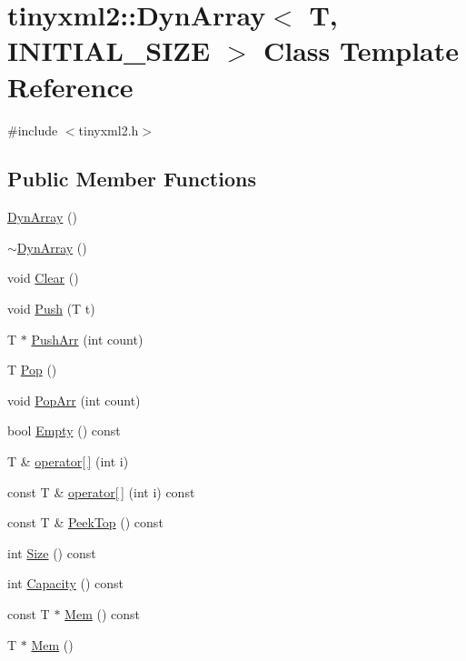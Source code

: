 \hypertarget{classtinyxml2_1_1_dyn_array}{}\section{tinyxml2\+:\+:Dyn\+Array$<$ T, I\+N\+I\+T\+I\+A\+L\+\_\+\+S\+I\+ZE $>$ Class Template Reference}
\label{classtinyxml2_1_1_dyn_array}


{\ttfamily \#include $<$tinyxml2.\+h$>$}

\subsection*{Public Member Functions}
\begin{DoxyCompactItemize}
\item 
\hyperlink{classtinyxml2_1_1_dyn_array_aaad72f384e761c70a4519183eb8fea17}{Dyn\+Array} ()
\item 
\hyperlink{classtinyxml2_1_1_dyn_array_a4a6aefdca7fe0d3f4068e31870a5adee}{$\sim$\+Dyn\+Array} ()
\item 
void \hyperlink{classtinyxml2_1_1_dyn_array_af87a804cd831226d069274b44b74b8bc}{Clear} ()
\item 
void \hyperlink{classtinyxml2_1_1_dyn_array_aea7ffe983b5d3284bd43171afd7c99d0}{Push} (T t)
\item 
T $\ast$ \hyperlink{classtinyxml2_1_1_dyn_array_ad289abee8cd02b26e215f1b63d2043f1}{Push\+Arr} (int count)
\item 
T \hyperlink{classtinyxml2_1_1_dyn_array_a27a3f2f6f869815b6eabb3ea40cf0712}{Pop} ()
\item 
void \hyperlink{classtinyxml2_1_1_dyn_array_ab8b8c94a2312ab27e2846f0d61ef677a}{Pop\+Arr} (int count)
\item 
bool \hyperlink{classtinyxml2_1_1_dyn_array_a044fc26f44ed3e96ffaeac542188149e}{Empty} () const
\item 
T \& \hyperlink{classtinyxml2_1_1_dyn_array_a756cf4e7464c711aa720e2b17a251daa}{operator\mbox{[}$\,$\mbox{]}} (int i)
\item 
const T \& \hyperlink{classtinyxml2_1_1_dyn_array_a474a5cd9bc97ea32b3dcef4c773125e1}{operator\mbox{[}$\,$\mbox{]}} (int i) const
\item 
const T \& \hyperlink{classtinyxml2_1_1_dyn_array_a5e4e1e408e646688503dec77c77c9d59}{Peek\+Top} () const
\item 
int \hyperlink{classtinyxml2_1_1_dyn_array_a67614d80847eb92cab330f1a5849a9a2}{Size} () const
\item 
int \hyperlink{classtinyxml2_1_1_dyn_array_a8e101fdf5b4248ac119d7dca6d0f5421}{Capacity} () const
\item 
const T $\ast$ \hyperlink{classtinyxml2_1_1_dyn_array_a60b33e61cf10b3fd900ee46692dc0fe9}{Mem} () const
\item 
T $\ast$ \hyperlink{classtinyxml2_1_1_dyn_array_a2f0842cd666e2ad951f1a8bd6561fa40}{Mem} ()
\end{DoxyCompactItemize}



